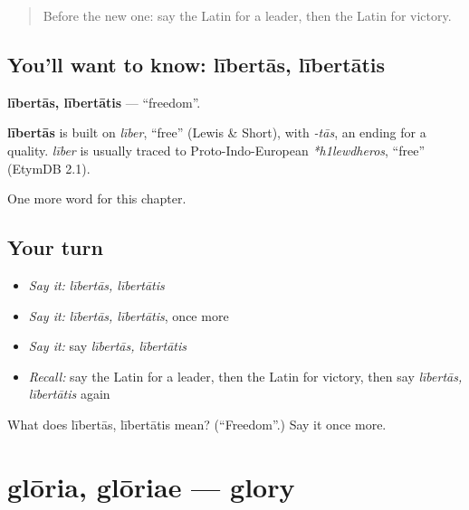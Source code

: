 \label{lesson:LA-C187-libertas}



\begin{quote}
Before the new one: say the Latin for a leader, then the Latin for victory.
\end{quote}

\subsection*{You'll want to know: lībertās, lībertātis}
\textbf{lībertās, lībertātis} — \textquotedblleft{}freedom\textquotedblright{}.

\begin{cousinweb}
\textbf{lībertās} is built on \emph{līber}, \textquotedblleft{}free\textquotedblright{} (Lewis \& Short), with \emph{-tās}, an ending for a quality. \emph{līber} is usually traced to Proto-Indo-European \emph{*h1lewdheros}, \textquotedblleft{}free\textquotedblright{} (EtymDB 2.1).
\end{cousinweb}

\begin{grammarlens}[title={What you've built}]
One more word for this chapter.
\end{grammarlens}

\subsection*{Your turn}
\begin{itemize}
\raggedright
  \item \emph{Say it:} \emph{lībertās, lībertātis}
  \item \emph{Say it:} \emph{lībertās, lībertātis}, once more
  \item \emph{Say it:} say \emph{lībertās, lībertātis}
  \item \emph{Recall:} say the Latin for a leader, then the Latin for victory, then say \emph{lībertās, lībertātis} again
\end{itemize}

\begin{tcolorbox}[breakable,colback=teal!4,colframe=teal!35!black,title={Before you move on}]
What does lībertās, lībertātis mean? (\textquotedblleft{}Freedom\textquotedblright{}.) Say it once more.
\end{tcolorbox}
\section[glōria, glōriae]{glōria, glōriae — glory}

